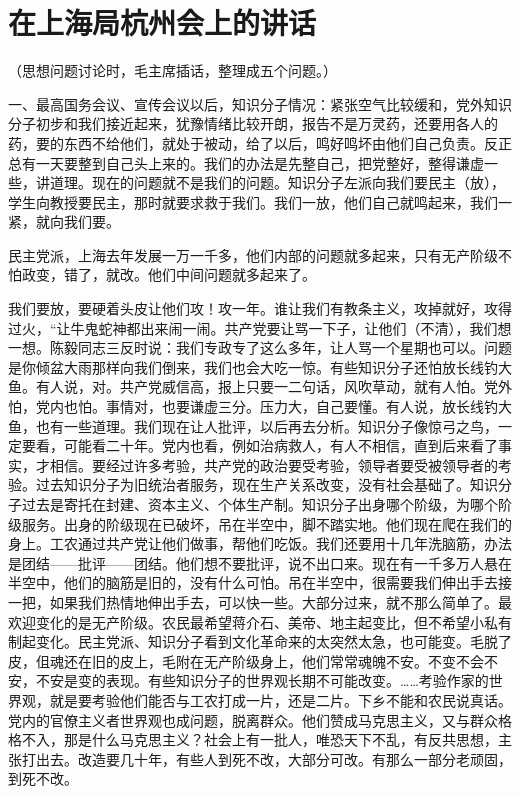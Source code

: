 \section[在上海局杭州会上的讲话（一九五七年四月）]{在上海局杭州会上的讲话}


（思想问题讨论时，毛主席插话，整理成五个问题。）

一、最高国务会议、宣传会议以后，知识分子情况：紧张空气比较缓和，党外知识分子初步和我们接近起来，犹豫情绪比较开朗，报告不是万灵药，还要用各人的药，要的东西不给他们，就处于被动，给了以后，鸣好鸣坏由他们自己负责。反正总有一天要整到自己头上来的。我们的办法是先整自己，把党整好，整得谦虚一些，讲道理。现在的问题就不是我们的问题。知识分子左派向我们要民主（放），学生向教授要民主，那时就要求救于我们。我们一放，他们自己就鸣起来，我们一紧，就向我们要。

民主党派，上海去年发展一万一千多，他们内部的问题就多起来，只有无产阶级不怕政变，错了，就改。他们中间问题就多起来了。

我们要放，要硬着头皮让他们攻！攻一年。谁让我们有教条主义，攻掉就好，攻得过火，“让牛鬼蛇神都出来闹一闹。共产党要让骂一下子，让他们（不清），我们想一想。陈毅同志三反时说：我们专政专了这么多年，让人骂一个星期也可以。问题是你倾盆大雨那样向我们倒来，我们也会大吃一惊。有些知识分子还怕放长线钓大鱼。有人说，对。共产党威信高，报上只要一二句话，风吹草动，就有人怕。党外怕，党内也怕。事情对，也要谦虚三分。压力大，自己要懂。有人说，放长线钓大鱼，也有一些道理。我们现在让人批评，以后再去分析。知识分子像惊弓之鸟，一定要看，可能看二十年。党内也看，例如治病救人，有人不相信，直到后来看了事实，才相信。要经过许多考验，共产党的政治要受考验，领导者要受被领导者的考验。过去知识分子为旧统治者服务，现在生产关系改变，没有社会基础了。知识分子过去是寄托在封建、资本主义、个体生产制。知识分子出身哪个阶级，为哪个阶级服务。出身的阶级现在已破坏，吊在半空中，脚不踏实地。他们现在爬在我们的身上。工农通过共产党让他们做事，帮他们吃饭。我们还要用十几年洗脑筋，办法是团结——批评——团结。他们想不要批评，说不出口来。现在有一千多万人悬在半空中，他们的脑筋是旧的，没有什么可怕。吊在半空中，很需要我们伸出手去接一把，如果我们热情地伸出手去，可以快一些。大部分过来，就不那么简单了。最欢迎变化的是无产阶级。农民最希望蒋介石、美帝、地主起变比，但不希望小私有制起变化。民主党派、知识分子看到文化革命来的太突然太急，也可能变。毛脱了皮，伹魂还在旧的皮上，毛附在无产阶级身上，他们常常魂魄不安。不变不会不安，不安是变的表现。有些知识分子的世界观长期不可能改变。……考验作家的世界观，就是要考验他们能否与工农打成一片，还是二片。下乡不能和农民说真话。党内的官僚主义者世界观也成问题，脱离群众。他们赞成马克思主义，又与群众格格不入，那是什么马克思主义？社会上有一批人，唯恐天下不乱，有反共思想，主张打出去。改造要几十年，有些人到死不改，大部分可改。有那么一部分老顽固，到死不改。

